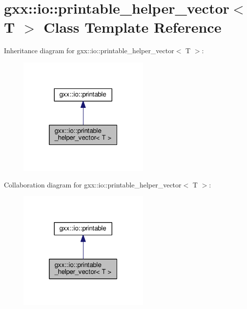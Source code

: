 \hypertarget{classgxx_1_1io_1_1printable__helper__vector}{}\section{gxx\+:\+:io\+:\+:printable\+\_\+helper\+\_\+vector$<$ T $>$ Class Template Reference}
\label{classgxx_1_1io_1_1printable__helper__vector}


Inheritance diagram for gxx\+:\+:io\+:\+:printable\+\_\+helper\+\_\+vector$<$ T $>$\+:
\nopagebreak
\begin{figure}[H]
\begin{center}
\leavevmode
\includegraphics[width=184pt]{classgxx_1_1io_1_1printable__helper__vector__inherit__graph}
\end{center}
\end{figure}


Collaboration diagram for gxx\+:\+:io\+:\+:printable\+\_\+helper\+\_\+vector$<$ T $>$\+:
\nopagebreak
\begin{figure}[H]
\begin{center}
\leavevmode
\includegraphics[width=184pt]{classgxx_1_1io_1_1printable__helper__vector__coll__graph}
\end{center}
\end{figure}
